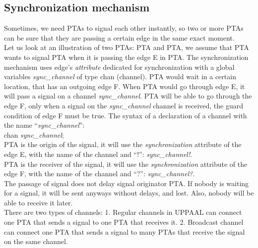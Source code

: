 \subsection{Synchronization mechanism}
Sometimes, we need PTAs to signal each other instantly, so two or more PTAs can be sure that they are passing a certain edge in the same exact moment.\\
Let us look at an illustration of two PTAs: PTA and PTA, we assume that PTA wants to signal PTA when it is passing the edge E in PTA. The synchronization mechanism uses edge’s \textit{attribute} dedicated for synchronization with a global variables \textcolor{ColorUppaalChannel}{\textit{sync_channel}} of type chan (channel). PTA would wait in a certain location, that has an outgoing edge F. When PTA would go through edge E, it will pass a signal on a channel \textcolor{ColorUppaalChannel}{\textit{sync_channel}}. PTA will be able to go through the edge F, only when a signal on the \textcolor{ColorUppaalChannel}{\textit{sync_channel}} channel is received, the guard condition of edge F must be true.  The syntax of a declaration of a channel with the name “\textcolor{ColorUppaalChannel}{\textit{sync_channel}}”:\\
        chan \textcolor{ColorUppaalChannel}{\textit{sync_channel}};\\
PTA is the origin of the signal, it will use the \textit{synchronization} attribute of the edge E, with the name of the channel and “!”: \textcolor{ColorUppaalChannel}{\textit{sync_channel!}}.\\
PTA is the receiver of the signal, it will use the \textit{synchronization} attribute of the edge F, with the name of the channel and “?”: \textcolor{ColorUppaalChannel}{\textit{sync_channel?}}.\\
The passage of signal does not delay signal originator PTA. If nobody is waiting for a signal, it will be sent anyways without delays, and lost. Also, nobody will be able to receive it later.\\
There are two types of channels: 1. Regular channels in UPPAAL can connect one PTA that sends a signal to one PTA that receives it. 2. Broadcast channel can connect one PTA that sends a signal to many PTAs that receive the signal on the same channel. \\
